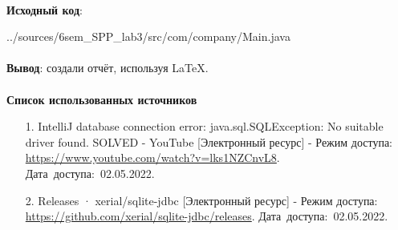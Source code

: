 \documentclass[12pt, a4paper, simple]{eskdtext}
\begin{document}
    \paragraph{} \textbf{Исходный код}: 

    
    {../sources/6sem_SPP_lab3/src/com/company/Main.java}


    \paragraph{} \textbf{Вывод}: создали отчёт, используя \LaTeX.

    \newpage
    \paragraph{} \textbf{Список использованных источников}
    \begin{enumerate}
        \item[1.] IntelliJ database connection error: java.sql.SQLException: No suitable driver found. SOLVED - YouTube [Электронный ресурс]
        - Режим доступа: \url{https://www.youtube.com/watch?v=lks1NZCnvL8}.
        Дата~доступа:~02.05.2022.
        \item[2.] Releases · xerial/sqlite-jdbc [Электронный ресурс]
        - Режим доступа: \url{https://github.com/xerial/sqlite-jdbc/releases}.
        Дата~доступа:~02.05.2022.
    \end{enumerate}
    \newpage
\end{document}
